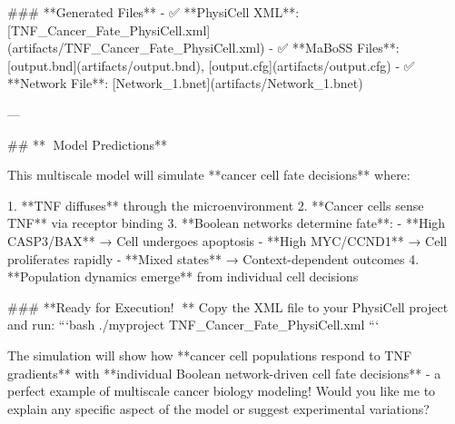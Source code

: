 \documentclass[11pt,a4paper]{article}
\begin{document}
\begin{copilotbox}
\#\#\# **Generated Files**
- ✅ **PhysiCell XML**: [TNF\_Cancer\_Fate\_PhysiCell.xml](artifacts/TNF\_Cancer\_Fate\_PhysiCell.xml)
- ✅ **MaBoSS Files**: [output.bnd](artifacts/output.bnd), [output.cfg](artifacts/output.cfg)
- ✅ **Network File**: [Network\_1.bnet](artifacts/Network\_1.bnet)

---

\#\# **🔬 Model Predictions**

This multiscale model will simulate **cancer cell fate decisions** where:

1. **TNF diffuses** through the microenvironment  
2. **Cancer cells sense TNF** via receptor binding
3. **Boolean networks determine fate**:
   - **High CASP3/BAX** → Cell undergoes apoptosis  
   - **High MYC/CCND1** → Cell proliferates rapidly
   - **Mixed states** → Context-dependent outcomes
4. **Population dynamics emerge** from individual cell decisions

\#\#\# **Ready for Execution! 🚀**
Copy the XML file to your PhysiCell project and run:
```bash
./myproject TNF\_Cancer\_Fate\_PhysiCell.xml
```

The simulation will show how **cancer cell populations respond to TNF gradients** with **individual Boolean network-driven cell fate decisions** - a perfect example of multiscale cancer biology modeling! Would you like me to explain any specific aspect of the model or suggest experimental variations?

\end{copilotbox}
\end{document}
